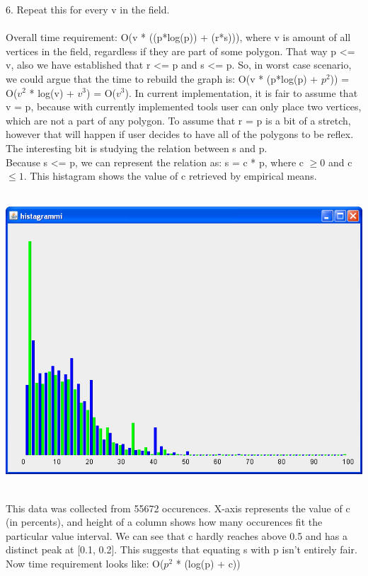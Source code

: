 \documentclass[a4paper,12pt]{article}
\begin{document}
6. Repeat this for every v in the field.\\
\\
Overall time requirement: O(v * ((p*log(p)) + (r*s))), where v is amount of all vertices in the field, regardless if they are part of some polygon. That way p \textless = v, also we have established that r \textless = p and s \textless = p. So, in worst case scenario, we could argue that the time to rebuild the graph is: O(v * (p*log(p) + $p^{2}$)) = O($v^{2}$ * log(v) + $v^{3}$) = O($v^{3}$). In current implementation, it is fair to assume that v = p, because with currently implemented tools user can only place two vertices, which are not a part of any polygon. To assume that r = p is a bit of a stretch, however that will happen if user decides to have all of the polygons to be reflex. The interesting bit is studying the relation between s and p.\\
Because s \textless = p, we can represent the relation as: s = c * p, where c $\geq{0}$ and c $\leq{1}$. This histagram shows the value of c retrieved by empirical means.\\ \\
\centerline{\includegraphics[scale=0.5]{histagram.png}} \hspace*{\fill} \\
This data was collected from 55672 occurences. X-axis represents the value of c (in percents), and height of a column shows how many occurences fit the particular value interval. We can see that c hardly reaches above 0.5 and has a distinct peak at [0.1, 0.2]. This suggests that equating s with p isn't entirely fair. Now time requirement looks like: O($p^{2}$ * (log(p) + c))\\
\end{document}
